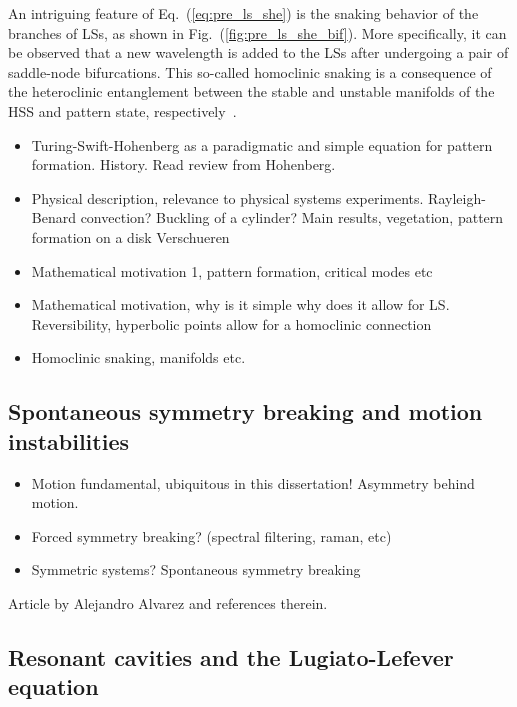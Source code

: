 An intriguing feature of Eq.~(\ref{eq:pre_ls_she}) is the snaking behavior of the branches of LSs, as shown
in Fig.~(\ref{fig:pre_ls_she_bif}). More specifically, it can be observed that a new wavelength 
is added to the LSs after undergoing a pair of saddle-node bifurcations.
This so-called homoclinic snaking is a consequence of the heteroclinic entanglement
between the stable and unstable manifolds of the HSS and pattern state, 
respectively~\cite{woods1999heteroclinic,coullet2000stable}.

\begin{itemize}
    \item Turing-Swift-Hohenberg as a paradigmatic and simple equation for pattern
formation. History. Read review from Hohenberg.
    \item Physical description, relevance to physical systems experiments. 
    Rayleigh-Benard convection? Buckling of a cylinder? Main results, vegetation,
    pattern formation on a disk Verschueren
    \item Mathematical motivation 1, pattern formation, critical modes etc
    \item Mathematical motivation, why is it simple why does it allow for LS.
Reversibility, hyperbolic points allow for a homoclinic connection
    \item Homoclinic snaking, manifolds etc.
\end{itemize}

\subsection{Spontaneous symmetry breaking and motion instabilities}

\begin{itemize}
    \item Motion fundamental, ubiquitous in this dissertation! Asymmetry behind motion.
    \item Forced symmetry breaking? (spectral filtering, raman, etc)
    \item Symmetric systems? Spontaneous symmetry breaking
\end{itemize}

Article by Alejandro Alvarez and references therein.


\subsection{Resonant cavities and the Lugiato-Lefever equation}

